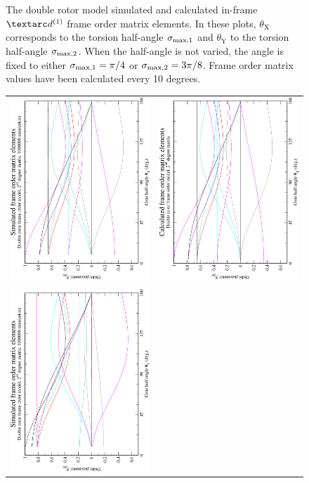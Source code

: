 \begin{figure}
\begin{tabular}{@{}cc@{}}
  \end{tabular}
  \caption[Double rotor simulated and calculated in-frame $\FOone$ elements.]{
    The double rotor model simulated and calculated in-frame $\FOone$ frame order matrix elements.
    In these plots, $\theta_\textrm{X}$ corresponds to the torsion half-angle $\sigma_{\textrm{max,1}}$ and $\theta_\textrm{Y}$ to the torsion half-angle $\sigma_{\textrm{max,2}}$.
    When the half-angle is not varied, the angle is fixed to either $\sigma_{\textrm{max,1}} = \pi/4$ or $\sigma_{\textrm{max,2}} = 3\pi/8$.
    Frame order matrix values have been calculated every 10 degrees.
  }
  \label{fig: simulated and calculated in-frame 1st degree double rotor frame order}
\end{figure}

\begin{figure}
\centering
  \begin{tabular}{@{}cc@{}}
    \includegraphics[width=.35\textwidth,angle=270]{images/frame_order_matrix/Sijkl_double_rotor_in_frame_theta_x_ens1000000.eps} &
    \includegraphics[width=.35\textwidth,angle=270]{images/frame_order_matrix/Sijkl_double_rotor_in_frame_theta_x_calc.eps} \\
    \\[-5pt]
    \includegraphics[width=.35\textwidth,angle=270]{images/frame_order_matrix/Sijkl_double_rotor_in_frame_theta_y_ens1000000.eps} &

\end{tabular}
\end{figure}
